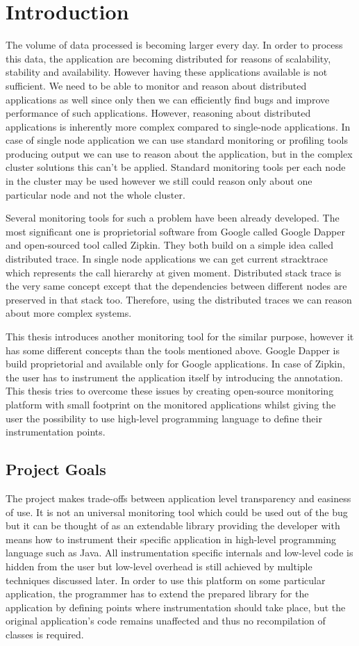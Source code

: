 \chapter{Introduction}
The volume of data processed is becoming larger every day. In order to process this data, the application are becoming distributed for reasons of scalability, stability and availability. However having these applications available is not sufficient. We need to be able to monitor and reason about distributed applications as well since only then we can efficiently find bugs and improve performance of such applications. However, reasoning about distributed applications is inherently more complex compared to single-node applications. In case of single node application we can use standard monitoring or profiling tools producing output we can use to reason about the application, but in the complex cluster solutions this can't be applied. Standard monitoring tools per each node in the cluster may be used however we still could reason only about one particular node and not the whole cluster.

Several monitoring tools for such a problem have been already developed. The most significant one is proprietorial software from Google called Google Dapper and open-sourced tool called Zipkin. They both build on a simple idea called distributed trace. In single node applications we can get current stracktrace which represents the call hierarchy at given moment. Distributed stack trace is the very same concept except that the dependencies between different nodes are preserved in that stack too. Therefore, using the distributed traces we can reason about more complex systems.

This thesis introduces another monitoring tool for the similar purpose, however it has some different concepts than the tools mentioned above. Google Dapper is build proprietorial and available only for Google applications. In case of Zipkin, the user has to instrument the application itself by introducing the annotation. This thesis tries to overcome these issues by creating open-source monitoring platform with small footprint on the monitored applications whilst giving the user the possibility to use high-level programming language to define their instrumentation points.

\section{Project Goals}
The project makes trade-offs between application level transparency and easiness of use. It is not an universal monitoring tool which could be used out of the bug but it can be thought of as an extendable library providing the developer with means how to instrument their specific application in high-level programming language such as Java. All instrumentation specific internals and low-level code is hidden from the user but low-level overhead is still achieved by multiple techniques discussed later. In order to use this platform on some particular application, the programmer has to extend the prepared library for the application by defining points where instrumentation should take place, but the original application's code remains unaffected and thus no recompilation of classes is required.

